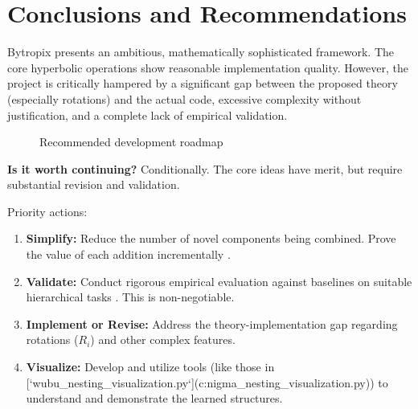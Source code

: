 \documentclass[11pt]{article}
\begin{document}
\section{Conclusions and Recommendations}

Bytropix presents an ambitious, mathematically sophisticated framework. The core hyperbolic operations show reasonable implementation quality. However, the project is critically hampered by a significant gap between the proposed theory (especially rotations) and the actual code, excessive complexity without justification, and a complete lack of empirical validation.

\begin{figure}[H]
\centering
{}
\caption{Recommended development roadmap}
\label{fig:recommendations} %
\end{figure}

\textbf{Is it worth continuing?} Conditionally. The core ideas have merit, but require substantial revision and validation.

Priority actions:
\begin{enumerate}[noitemsep]
    \item \textbf{Simplify:} Reduce the number of novel components being combined. Prove the value of each addition incrementally \cite{ChamiEtAl2019}.
    \item \textbf{Validate:} Conduct rigorous empirical evaluation against baselines on suitable hierarchical tasks \cite{KhrulkovEtAl2020}. This is non-negotiable.
    \item \textbf{Implement or Revise:} Address the theory-implementation gap regarding rotations ($R_i$) and other complex features.
    \item \textbf{Visualize:} Develop and utilize tools (like those in [`wubu_nesting_visualization.py`](c:\Users\3nigma\source\repos\bytropix\wubu_nesting_visualization.py)) to understand and demonstrate the learned structures.
\end{enumerate}
\end{document}

